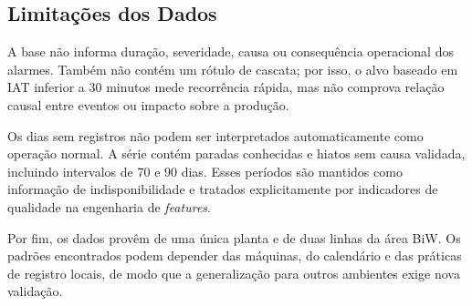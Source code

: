 \subsection{Limitações dos Dados}

A base não informa duração, severidade, causa ou consequência operacional dos alarmes. Também não contém um rótulo de cascata; por isso, o alvo baseado em IAT inferior a 30 minutos mede recorrência rápida, mas não comprova relação causal entre eventos ou impacto sobre a produção.

Os dias sem registros não podem ser interpretados automaticamente como operação normal. A série contém paradas conhecidas e hiatos sem causa validada, incluindo intervalos de 70 e 90 dias. Esses períodos são mantidos como informação de indisponibilidade e tratados explicitamente por indicadores de qualidade na engenharia de \textit{features}.

Por fim, os dados provêm de uma única planta e de duas linhas da área BiW. Os padrões encontrados podem depender das máquinas, do calendário e das práticas de registro locais, de modo que a generalização para outros ambientes exige nova validação.
